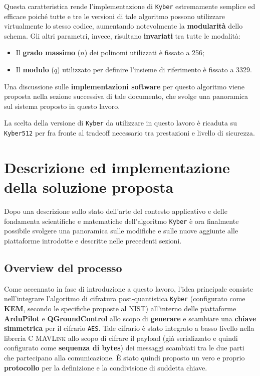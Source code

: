 \documentclass[a4paper, 12pt, oneside]{article}
\theoremstyle{definition}
\begin{document}
Questa caratteristica rende l'implementazione di \texttt{Kyber} estremamente semplice ed efficace poiché tutte e tre le versioni di tale algoritmo possono utilizzare virtualmente lo stesso codice, aumentando notevolmente la \textbf{modularità} dello schema.
\newpage
Gli altri parametri, invece, risultano \textbf{invariati} tra tutte le modalità:

\begin{itemize}
    \item Il \textbf{grado massimo} ($n$) dei polinomi utilizzati è fissato a 256;
    \item Il \textbf{modulo} ($q$) utilizzato per definire l'insieme di riferimento è fissato a 3329.
\end{itemize}

Una discussione sulle \textbf{implementazioni software} per questo algoritmo viene proposta nella sezione successiva di tale documento, che svolge una panoramica sul sistema proposto in questo lavoro.

La scelta della versione di \texttt{Kyber} da utilizzare in questo lavoro è ricaduta su \texttt{Kyber512} per fra fronte al tradeoff necessario tra prestazioni e livello di sicurezza.

\newpage
\section{Descrizione ed implementazione della soluzione proposta}
Dopo una descrizione sullo stato dell'arte del contesto applicativo e delle fondamenta scientifiche e matematiche dell'algoritmo \texttt{Kyber} è ora finalmente possibile svolgere una panoramica sulle modifiche e sulle nuove aggiunte alle piattaforme introdotte e descritte nelle precedenti sezioni.

\subsection{Overview del processo}
Come accennato in fase di introduzione a questo lavoro, l'idea principale consiste nell'integrare l'algoritmo di cifratura post-quantistica \texttt{Kyber} (configurato come \textbf{KEM}, secondo le specifiche proposte al NIST) all'interno delle piattaforme \textbf{ArduPilot} e \textbf{QGroundControl} allo scopo di \textbf{generare} e scambiare una \textbf{chiave simmetrica} per il cifrario \texttt{AES}. Tale cifrario è stato integrato a basso livello nella libreria C \textsc{MAVLink} allo scopo di cifrare il payload (già serializzato e quindi configurato come \textbf{sequenza di bytes}) dei messaggi scambiati tra le due parti che partecipano alla comunicazione. È stato quindi proposto un vero e proprio \textbf{protocollo} per la definizione e la condivisione di suddetta chiave.
\end{document}
